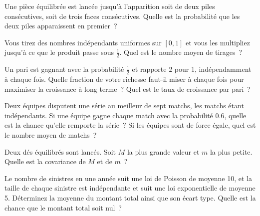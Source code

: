 
\begin{question}\label{iq:iv1:timed-test-4:7}
Une pièce équilibrée est lancée jusqu'à l'apparition soit de deux piles consécutives, soit de trois faces consécutives. Quelle est la probabilité que les deux piles apparaissent en premier~?
\end{question}

\begin{question}\label{iq:iv1:timed-test-4:8}
Vous tirez des nombres indépendants uniformes sur $[0, 1]$ et vous les multipliez jusqu'à ce que le produit passe sous $\frac12$. Quel est le nombre moyen de tirages~?
\end{question}

\begin{question}\label{iq:iv1:timed-test-4:9}
Un pari est gagnant avec la probabilité $\frac12$ et rapporte 2 pour 1, indépendamment à chaque fois. Quelle fraction de votre richesse faut-il miser à chaque fois pour maximiser la croissance à long terme~? Quel est le taux de croissance par pari~?
\end{question}

\begin{question}\label{iq:iv1:timed-test-4:10}
Deux équipes disputent une série au meilleur de sept matchs, les matchs étant indépendants. Si une équipe gagne chaque match avec la probabilité $0.6$, quelle est la chance qu'elle remporte la série~? Si les équipes sont de force égale, quel est le nombre moyen de matchs~?
\end{question}

\begin{question}\label{iq:iv1:timed-test-4:11}
Deux dés équilibrés sont lancés. Soit $M$ la plus grande valeur et $m$ la plus petite. Quelle est la covariance de $M$ et de $m$~?
\end{question}

\begin{question}\label{iq:iv1:timed-test-4:12}
Le nombre de sinistres en une année suit une loi de Poisson de moyenne 10, et la taille de chaque sinistre est indépendante et suit une loi exponentielle de moyenne 5. Déterminez la moyenne du montant total ainsi que son écart type. Quelle est la chance que le montant total soit nul~?
\end{question}
